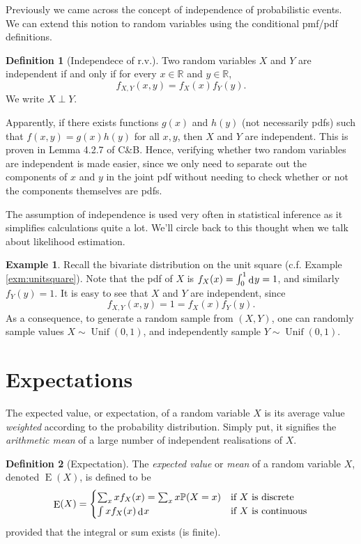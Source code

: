 \documentclass[
]{book}
\DeclareMathOperator{\E}{E}
\DeclareMathOperator{\Unif}{Unif}
\newcommand{\bbR}{\mathbb{R}}
\newcommand{\bbP}{\mathbb{P}}
\DeclareMathOperator{\dd}{d}
\newcommand{\dint}{\dd\hspace{0.5pt}\!}
\theoremstyle{definition}
\newtheorem{definition}{Definition}[chapter]
\theoremstyle{definition}
\newtheorem{example}{Example}[chapter]
\theoremstyle{definition}
\theoremstyle{definition}
\theoremstyle{remark}
\begin{document}
Previously we came across the concept of independence of probabilistic events.
We can extend this notion to random variables using the conditional pmf/pdf definitions.

\begin{definition}[Independece of r.v.]
Two random variables \(X\) and \(Y\) are independent if and only if for every \(x\in\bbR\) and \(y\in\bbR\),
\[
  f_{X,Y}(x,y) = f_X(x)f_Y(y).
\]
We write \(X \perp Y\).
\end{definition}

Apparently, if there exists functions \(g(x)\) and \(h(y)\) (not necessarily pdfs) such that \(f(x,y)=g(x)h(y)\) for all \(x,y\), then \(X\) and \(Y\) are independent.
This is proven in Lemma 4.2.7 of C\&B.
Hence, verifying whether two random variables are independent is made easier, since we only need to separate out the components of \(x\) and \(y\) in the joint pdf without needing to check whether or not the components themselves are pdfs.

The assumption of independence is used very often in statistical inference as it simplifies calculations quite a lot.
We'll circle back to this thought when we talk about likelihood estimation.

\begin{example}
Recall the bivariate distribution on the unit square (c.f. Example \ref{exm:unitsquare}).
Note that the pdf of \(X\) is \(f_X(x) = \int_0^1 \dint y = 1\), and similarly \(f_Y(y)=1\).
It is easy to see that \(X\) and \(Y\) are independent, since
\[
f_{X,Y}(x,y) = 1 = f_X(x)f_Y(y).
\]
As a consequence, to generate a random sample from \((X,Y)\), one can randomly sample values \(X\sim\Unif(0,1)\), and independently sample \(Y\sim\Unif(0,1)\).
\end{example}

\hypertarget{expectations}{%
\section{Expectations}\label{expectations}}

The expected value, or expectation, of a random variable \(X\) is its average value \emph{weighted} according to the probability distribution.
Simply put, it signifies the \emph{arithmetic mean} of a large number of independent realisations of \(X\).

\begin{definition}[Expectation]
The \emph{expected value} or \emph{mean} of a random variable \(X\), denoted \(\E(X)\), is defined to be
\[
\E(X) = \begin{cases}
  \sum_x x f_X(x) = \sum_x x \bbP(X=x) &\text{if $X$ is discrete} \\
  \int x f_X(x) \dint x &\text{if $X$ is continuous} \\  
\end{cases}
\]
provided that the integral or sum exists (is finite).
\end{definition}
\end{document}
